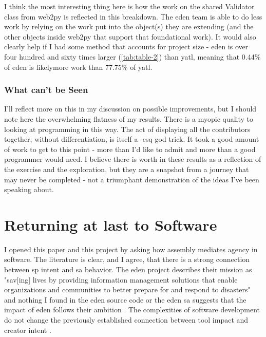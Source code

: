 \documentclass[a4paper,man,natbib,floatsintext]{apa6}
\begin{document}
  I think the most interesting thing here is how the work on the shared Validator class from web2py is reflected in this breakdown. The \acrshort{eden} team is able to do less work by relying on the work put into the object(s) they are extending (and the other objects inside web2py that support that foundational work). It would also clearly help if I had some method that accounts for project size - \acrshort{eden} is over four hundred and sixty times larger (\ref{tab:table-2}) than yatl, meaning that 0.44\% of \acrshort{eden} is likely\footnotemark more work than 77.75\% of yatl.


  \subsubsection{What can't be Seen}
  I'll reflect more on this in my discussion on possible improvements, but I should note here the overwhelming flatness of my results. There is a myopic quality to looking at programming in this way. The act of displaying all the contributors together, without differentiation, is itself a \citet{Haraway1988-nh}-esq god trick. It took a good amount of work to get to this point - more than I'd like to admit and more than a good programmer would need. I believe there is worth in these results as a reflection of the exercise and the exploration, but they are a snapshot from a journey that may never be completed - not a triumphant demonstration of the ideas I've been speaking about.

  \section{Returning at last to Software}
  I opened this paper and this project by asking how assembly mediates agency in software. The literature is clear, and I agree, that there is a strong connection between \gls{sp} intent and \gls{sa} behavior. The \acrshort{eden} project describes their mission as "sav[ing] lives by providing information management solutions that enable organizations and communities to better prepare for and respond to disasters" and nothing I found in the \acrshort{eden} source code or the \acrshort{eden} \gls{sa} suggests that the impact of \acrshort{eden} follows their ambition \citep{Sahana_Foundation_undated-hl}. The complexities of software development do not change the previously established connection between tool impact and creator intent \citet{Subramaniam2014-wg}. 
\end{document}
